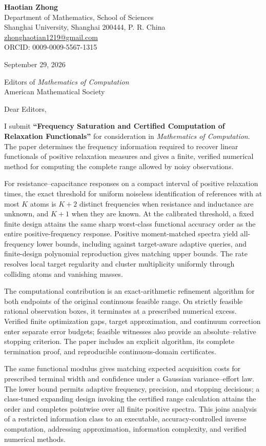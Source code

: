 \documentclass[11pt,letterpaper]{article}
\begin{document}
\textbf{Haotian Zhong}\\
Department of Mathematics, School of Sciences\\
Shanghai University, Shanghai 200444, P. R. China\\
\href{mailto:zhonghaotian1219@gmail.com}{zhonghaotian1219@gmail.com}\\
ORCID: 0009-0009-5567-1315

September 29, 2026

Editors of \textit{Mathematics of Computation}\\
American Mathematical Society

Dear Editors,

I submit \textbf{``Frequency Saturation and Certified Computation of Relaxation Functionals''} for consideration in \textit{Mathematics of Computation}. The paper determines the frequency information required to recover linear functionals of positive relaxation measures and gives a finite, verified numerical method for computing the complete range allowed by noisy observations.

For resistance--capacitance responses on a compact interval of positive relaxation times, the exact threshold for uniform noiseless identification of references with at most $K$ atoms is $K+2$ distinct frequencies when resistance and inductance are unknown, and $K+1$ when they are known. At the calibrated threshold, a fixed finite design attains the same sharp worst-class functional accuracy order as the entire positive-frequency response. Positive moment-matched spectra yield all-frequency lower bounds, including against target-aware adaptive queries, and finite-design polynomial reproduction gives matching upper bounds. The rate resolves local target regularity and cluster multiplicity uniformly through colliding atoms and vanishing masses.

The computational contribution is an exact-arithmetic refinement algorithm for both endpoints of the original continuous feasible range. On strictly feasible rational observation boxes, it terminates at a prescribed numerical excess. Verified finite optimization gaps, target approximation, and continuum correction enter separate error budgets; feasible witnesses also provide an absolute--relative stopping criterion. The paper includes an explicit algorithm, its complete termination proof, and reproducible continuous-domain certificates.

The same functional modulus gives matching expected acquisition costs for prescribed terminal width and confidence under a Gaussian variance--effort law. The lower bound permits adaptive frequency, precision, and stopping decisions; a class-tuned expanding design invoking the certified range calculation attains the order and completes pointwise over all finite positive spectra. This joins analysis of a restricted information class to an executable, accuracy-controlled inverse computation, addressing approximation, information complexity, and verified numerical methods.
\end{document}

